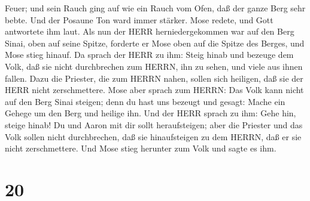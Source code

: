 Feuer; und sein Rauch ging auf wie ein Rauch vom Ofen, daß der ganze
Berg sehr bebte.  Und der Posaune Ton ward immer stärker.
Mose redete, und Gott antwortete ihm laut.  Als nun der
HERR herniedergekommen war auf den Berg Sinai, oben auf seine Spitze,
forderte er Mose oben auf die Spitze des Berges, und Mose stieg hinauf.
 Da sprach der HERR zu ihm: Steig hinab und bezeuge dem
Volk, daß sie nicht durchbrechen zum HERRN, ihn zu sehen, und viele aus
ihnen fallen.  Dazu die Priester, die zum HERRN nahen,
sollen sich heiligen, daß sie der HERR nicht zerschmettere.
 Mose aber sprach zum HERRN: Das Volk kann nicht auf den
Berg Sinai steigen; denn du hast uns bezeugt und gesagt: Mache ein
Gehege um den Berg und heilige ihn.  Und der HERR sprach zu
ihm: Gehe hin, steige hinab! Du und Aaron mit dir sollt heraufsteigen;
aber die Priester und das Volk sollen nicht durchbrechen, daß sie
hinaufsteigen zu dem HERRN, daß er sie nicht zerschmettere.
 Und Mose stieg herunter zum Volk und sagte es ihm.

\hypertarget{section-19}{%
\section{20}\label{section-19}}

